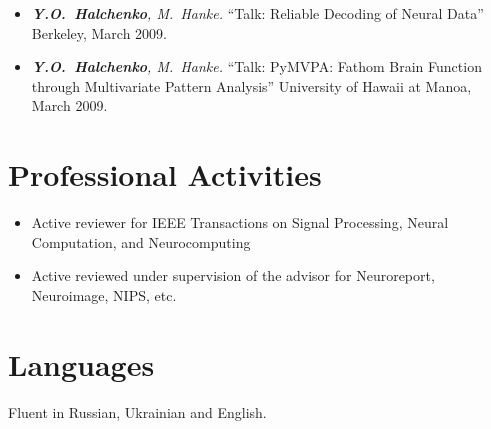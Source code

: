 \documentclass[12pt,overlapped,line]{res}
\newcommand{\mtitle}[1]{``#1''}
\newcommand{\mauthors}[1]{ \textit{#1.}}
\newcommand{\mwhere}[1]{#1.}
\begin{document}
\begin{resume}
\begin{itemize}
 \item
   \mauthors{\textbf{Y.O.~Halchenko}, M.~Hanke}
   \mtitle{Talk: Reliable Decoding of Neural Data}
   \mwhere{Berkeley, March 2009}

 \item
   \mauthors{\textbf{Y.O.~Halchenko}, M.~Hanke}
   \mtitle{Talk: PyMVPA: Fathom Brain Function through
     Multivariate Pattern Analysis}
   \mwhere{University of Hawaii at Manoa, March 2009}

 \end{itemize}



\section{Professional Activities}
\begin{itemize}
\item Active reviewer for IEEE Transactions on Signal Processing,
  Neural Computation, and Neurocomputing
\item Active reviewed under supervision of the advisor for
  Neuroreport, Neuroimage, NIPS, etc.
\end{itemize}


 \section{Languages}
 Fluent in Russian, Ukrainian and English.


\end{resume}
\end{document}
